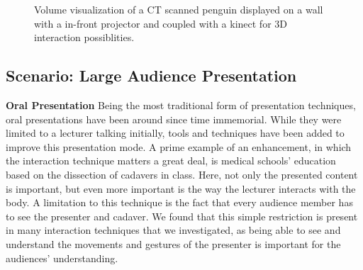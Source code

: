 \documentclass[review,journal]{vgtc}         %
\begin{document}
\begin{figure}[htb]
	\centering
	\caption{Volume visualization of a CT scanned penguin displayed on a wall with a in-front projector and coupled with a kinect for 3D interaction possiblities.}
	\label{img:exhibition_kinect}
\end{figure}

\subsection{Scenario: Large Audience Presentation}
\noindent \textbf{Oral Presentation} Being the most traditional form of presentation techniques, oral presentations have been around since time immemorial.
While they were limited to a lecturer talking initially, tools and techniques have been added to improve this presentation mode.
A prime example of an enhancement, in which the interaction technique matters a great deal, is medical schools' education based on the dissection of cadavers in class.
Here, not only the presented content is important, but even more important is the way the lecturer interacts with the body.
A limitation to this technique is the fact that every audience member has to see the presenter and cadaver.
We found that this simple restriction is present in many interaction techniques that we investigated, as being able to see and understand the movements and gestures of the presenter is important for the audiences' understanding.
\end{document}

